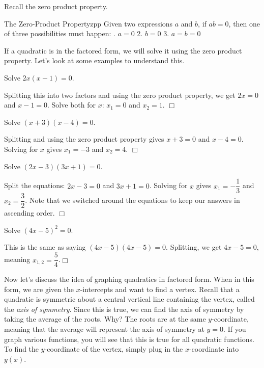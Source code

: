 \documentclass[../book.tex]{subfiles}
\begin{document}
Recall the zero product property.
\begin{theorem}{The Zero-Product Property}{zpp}
Given two expressions $a$ and $b$, if $ab=0$, then one of three possibilities must happen: \newline 
{.  $a=0$ \hspace{35mm} 2.  $b=0$ \hspace{35mm} 3.  $a=b=0$}
\end{theorem}
If a quadratic is in the factored form, we will solve it using the zero product property.  Let's look at some examples to understand this.
\begin{example}
Solve $2x(x-1)=0$.
\end{example}
\begin{solution}
Splitting this into two factors and using the zero product property, we get $2x=0$ and $x-1=0$.  Solve both for $x$: $x_1=0$ and $x_2=1$.  $\Box$
\end{solution}
\begin{example}
Solve $(x+3)(x-4)=0$.
\end{example}
\begin{solution}
Splitting and using the zero product property gives $x+3=0$ and $x-4=0$.  Solving for $x$ gives $x_1=-3$ and $x_2=4$.  $\Box$
\end{solution}
\begin{example}
Solve $(2x-3)(3x+1)=0$.
\end{example}
\begin{solution}
Split the equations: $2x-3=0$ and $3x+1=0$.  Solving for $x$ gives $x_1=-\dfrac{1}{3}$ and $x_2=\dfrac{3}{2}$.  Note that we switched around the equations to keep our answers in ascending order.  $\Box$
\end{solution}
\begin{example}
Solve $(4x-5)^2=0$.
\end{example}
\begin{solution}
This is the same as saying $(4x-5)(4x-5)=0$.  Splitting, we get $4x-5=0$, meaning $x_{1,2}=\dfrac{5}{4}$.$\Box$
\end{solution}
Now let's discuss the idea of graphing quadratics in factored form.  When in this form, we are given the $x$-intercepts and want to find a vertex.  Recall that a quadratic is symmetric about a central vertical line containing the vertex, called the \textit{axis of symmetry}.  Since this is true, we can find the axis of symmetry by taking the average of the roots.  Why?  The roots are at the same $y$-coordinate, meaning that the average will represent the axis of symmetry at $y=0$.  If you graph various functions, you will see that this is true for all quadratic functions.  To find the $y$-coordinate of the vertex, simply plug in the $x$-coordinate into $y(x)$.  
\end{document}
